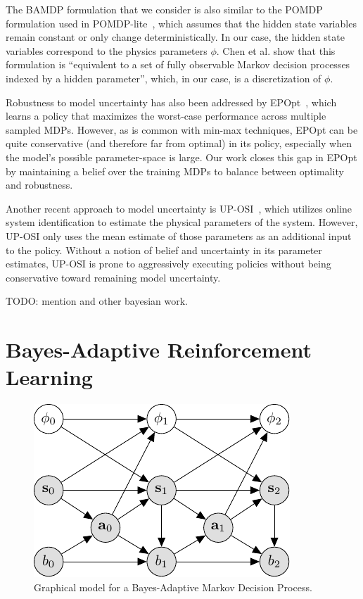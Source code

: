 \documentclass{article}
\begin{document}
%
The BAMDP formulation that we consider is also similar to the POMDP formulation used in POMDP-lite~\cite{chen2016pomdp}, which assumes that the hidden state variables remain constant or only change deterministically.
In our case, the hidden state variables correspond to the physics parameters $\phi$.
Chen et al. show that this formulation is ``equivalent to a set of fully observable Markov decision processes indexed by a hidden parameter'', which, in our case, is a discretization of $\phi$.

Robustness to model uncertainty has also been addressed by EPOpt~\cite{rajeswaran2016epopt}, which learns a policy that maximizes the worst-case performance across multiple sampled MDPs.
However, as is common with min-max techniques, EPOpt can be quite conservative (and therefore far from optimal) in its policy, especially when the model's possible parameter-space is large.
Our work closes this gap in EPOpt by maintaining a belief over the training MDPs to balance between optimality and robustness.

Another recent approach to model uncertainty is UP-OSI~\cite{yu2017uposi}, which utilizes online system identification to estimate the physical parameters of the system.
However, UP-OSI only uses the mean estimate of those parameters as an additional input to the policy.
Without a notion of belief and uncertainty in its parameter estimates, UP-OSI is prone to aggressively executing policies without being conservative toward remaining model uncertainty.

TODO: mention \cite{guez2014bayes} and other bayesian work.

\section{Bayes-Adaptive Reinforcement Learning}

\begin{figure}[t!]
\centering
\includegraphics[width=0.5\linewidth]{figs/model.pdf}
\caption{Graphical model for a Bayes-Adaptive Markov Decision Process.}
\label{fig:pgm}
\end{figure}
\end{document}
